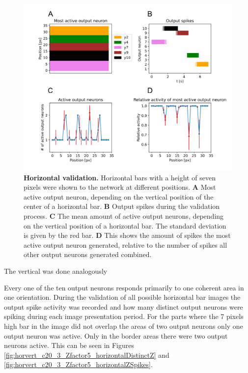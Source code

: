 \begin{figure}
  \includegraphics[width=\linewidth]{figures/horvertAdaptiveInh/horizontal_validation.png}
  \caption{\textbf{Horizontal validation.} Horizontal bars with a height of seven pixels were shown to the network at different positions. \textbf{A} Most active output neuron, depending on the vertical position of the center of a horizontal bar. \textbf{B} Output spikes during the validation process. \textbf{C} The mean amount of active output neurons, depending on the vertical position of a horizontal bar. The standard deviation is given by the red bar.  \textbf{D} This shows the amount of spikes the most active output neuron generated, relative to the number of spikes all other output neurons generated combined. }
  \label{fig:horvertAdaptiveInhibitionHorizontalValResults}
\end{figure}

 The vertical was done analogously
 
Every one of the ten output neurons responds primarily to one coherent area in one orientation.
During the validation of all possible horizontal bar images the output spike activity was recorded and how many distinct output neurons were spiking during each image presentation period. For the parts where the 7 pixels high bar in the image did not overlap the areas of two output neurons only one output neuron was active. Only in the border areas there were two output neurons active. This can be seen in Figures \ref{fig:horvert_c20_3_Zfactor5_horizontalDistinctZ} and \ref{fig:horvert_c20_3_Zfactor5_horizontalZSpikes}.






